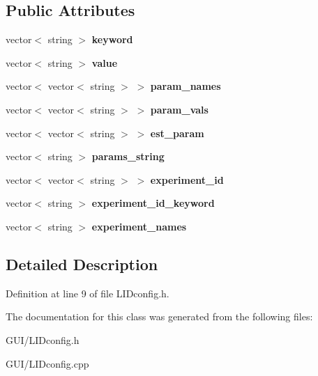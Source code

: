 \subsection*{Public Attributes}
\begin{DoxyCompactItemize}
\item 
\mbox{\label{class_c_l_i_dconfig_a9dc21c252a6ccae4ff0690ebb4102e72}} 
vector$<$ string $>$ {\bfseries keyword}
\item 
\mbox{\label{class_c_l_i_dconfig_a34136717b5eac97a561a954dfec47f9e}} 
vector$<$ string $>$ {\bfseries value}
\item 
\mbox{\label{class_c_l_i_dconfig_ab54999dfe7cbfc3f428122b1eec2eb20}} 
vector$<$ vector$<$ string $>$ $>$ {\bfseries param\+\_\+names}
\item 
\mbox{\label{class_c_l_i_dconfig_a08e2237399212b54e70682d08631546c}} 
vector$<$ vector$<$ string $>$ $>$ {\bfseries param\+\_\+vals}
\item 
\mbox{\label{class_c_l_i_dconfig_a87854fd8aaa951e4adbb1c09ed1870d3}} 
vector$<$ vector$<$ string $>$ $>$ {\bfseries est\+\_\+param}
\item 
\mbox{\label{class_c_l_i_dconfig_a6ef6bc3a17e4eb2998f3fb6194782929}} 
vector$<$ string $>$ {\bfseries params\+\_\+string}
\item 
\mbox{\label{class_c_l_i_dconfig_a94153b911461f554986bc9885bd4213b}} 
vector$<$ vector$<$ string $>$ $>$ {\bfseries experiment\+\_\+id}
\item 
\mbox{\label{class_c_l_i_dconfig_a29c1ecc63f20d467ae2ede66d914f456}} 
vector$<$ string $>$ {\bfseries experiment\+\_\+id\+\_\+keyword}
\item 
\mbox{\label{class_c_l_i_dconfig_a341025e5cae23f2158c1736881190580}} 
vector$<$ string $>$ {\bfseries experiment\+\_\+names}
\end{DoxyCompactItemize}


\subsection{Detailed Description}


Definition at line 9 of file L\+I\+Dconfig.\+h.



The documentation for this class was generated from the following files\+:\begin{DoxyCompactItemize}
\item 
G\+U\+I/L\+I\+Dconfig.\+h\item 
G\+U\+I/L\+I\+Dconfig.\+cpp\end{DoxyCompactItemize}
